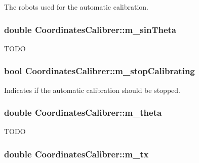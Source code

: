 \label{classCoordinatesCalibrer_aebcdb5e598d2af268ab93a0271c245b6}
The robots used for the automatic calibration. \hypertarget{classCoordinatesCalibrer_af2675b7f9f8612eb53e81a5268501180}{
\subsubsection[{m\_\-sinTheta}]{\setlength{\rightskip}{0pt plus 5cm}double {\bf CoordinatesCalibrer::m\_\-sinTheta}}}
\label{classCoordinatesCalibrer_af2675b7f9f8612eb53e81a5268501180}
TODO \hypertarget{classCoordinatesCalibrer_ac8da80d736936d73e78f21a7f046855d}{
\subsubsection[{m\_\-stopCalibrating}]{\setlength{\rightskip}{0pt plus 5cm}bool {\bf CoordinatesCalibrer::m\_\-stopCalibrating}}}
\label{classCoordinatesCalibrer_ac8da80d736936d73e78f21a7f046855d}
Indicates if the automatic calibration should be stopped. \hypertarget{classCoordinatesCalibrer_a039975d1cf826afcb960e77f8f957f91}{
\subsubsection[{m\_\-theta}]{\setlength{\rightskip}{0pt plus 5cm}double {\bf CoordinatesCalibrer::m\_\-theta}}}
\label{classCoordinatesCalibrer_a039975d1cf826afcb960e77f8f957f91}
TODO \hypertarget{classCoordinatesCalibrer_ad3dcf12acb15253d8467440ccf917581}{
\subsubsection[{m\_\-tx}]{\setlength{\rightskip}{0pt plus 5cm}double {\bf CoordinatesCalibrer::m\_\-tx}}}
